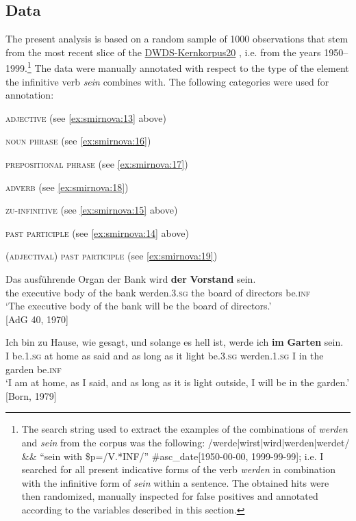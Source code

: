 \documentclass[output=paper,colorlinks,citecolor=brown]{langscibook}
\begin{document}
\subsection{Data} \label{sec:smirnova:4.1}
The present analysis is based on a random sample of 1000 observations that stem from the most recent slice of the \href{https://www.dwds.de/d/korpora/kern}{DWDS-Kernkorpus20} \citep{geyken2007dwds}, i.e. from the years 1950–1999.\footnote{The search string used to extract the examples of the combinations of \emph{werden} and \emph{sein} from the corpus was the following: /werde|wirst|wird|werden|werdet/ \&\& ``sein with \$p=/V.*INF/'' \#asc\_date[1950-00-00, 1999-99-99]; i.e. I searched for all present indicative forms of the verb \emph{werden} in combination with the infinitive form of \emph{sein} within a sentence. The obtained hits were then randomized,  manually inspected for false positives and annotated according to the variables described in this section.} The data were manually annotated with respect to the type of the element the infinitive verb \emph{sein} combines with. The following categories were used for annotation:
\begin{compactitem}
    \item \textsc{adjective} (see \ref{ex:smirnova:13} above)
    \item \textsc{noun phrase} (see \ref{ex:smirnova:16})
    \item \textsc{prepositional phrase} (see \ref{ex:smirnova:17})
    \item \textsc{adverb} (see \ref{ex:smirnova:18})
    \item \textsc{zu-infinitive} (see \ref{ex:smirnova:15} above) 
    \item \textsc{past participle} (see \ref{ex:smirnova:14} above)
    \item \textsc{(adjectival) past participle} (see \ref{ex:smirnova:19})
\end{compactitem}



\ea\label{ex:smirnova:16}
\gll Das ausführende Organ der Bank wird \textbf{der} \textbf{Vorstand} sein. \\
    the executive body {of the} bank werden.\textsc{3.sg} the {board of directors} be.\textsc{inf} \\
\glt `The executive body of the bank will be the board of directors.'\\
\hfill [AdG 40, 1970]
\z


\ea\label{ex:smirnova:17}
\gll Ich bin zu Hause, wie gesagt, und solange es hell ist, werde ich \textbf{im} \textbf{Garten} sein. \\
    I be.\textsc{1.sg} at home as said and {as long as} it light be.\textsc{3.sg} werden.\textsc{1.sg} I {in the} garden be.\textsc{inf} \\
\glt `I am at home, as I said, and as long as it is light outside, I will be in the garden.'\\
\hfill [Born, 1979]
\z
\end{document}
